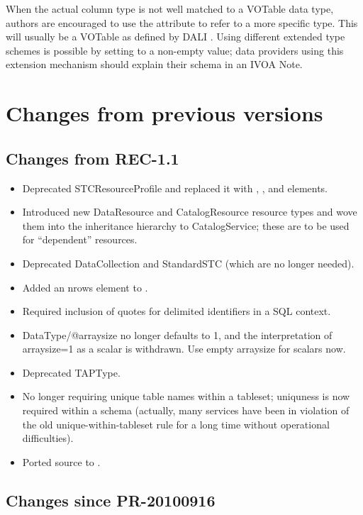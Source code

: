 \documentclass[11pt,a4paper]{ivoa}
\begin{document}
When the actual column type is not
well matched to a VOTable data type, authors are
encouraged to use the  attribute to refer to
a more specific type.  This will usually be a VOTable  as
defined by DALI \citep{2017ivoa.spec.0517D}.  Using different extended
type schemes is possible by setting  to a
non-empty value; data providers using this extension mechanism should
explain their schema in an IVOA Note.

\appendix

\section{Changes from previous versions}

\subsection{Changes from REC-1.1}

\begin{itemize}
\item Deprecated STCResourceProfile and replaced it with
, , and  elements.
\item Introduced new DataResource and CatalogResource resource types
and wove them into the inheritance hierarchy to CatalogService; these
are to be used for ``dependent'' resources.
\item Deprecated DataCollection and StandardSTC (which are no longer
needed).
\item Added an nrows element to .
\item Required inclusion of quotes for delimited identifiers in a
SQL context.
\item DataType/@arraysize no longer defaults to 1, and the
interpretation of arraysize=1 as a scalar is withdrawn.  Use empty
arraysize for scalars now.
\item Deprecated TAPType.
\item No longer requiring unique table names within a tableset;
uniquness is now required within a schema (actually, many services have
been in violation of the old unique-within-tableset rule for a long time
without operational difficulties).
\item Ported source to \ivoatex.
\end{itemize}

\subsection{Changes since PR-20100916}
\end{document}
